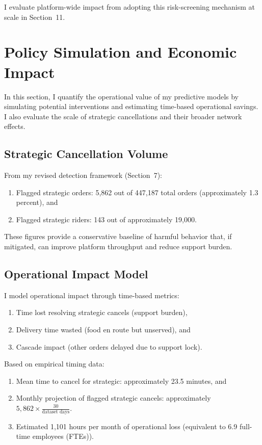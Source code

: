 \documentclass[12pt,letterpaper]{article}
\begin{document}
I evaluate platform-wide impact from adopting this risk-screening mechanism at scale in Section~11.

\section{Policy Simulation and Economic Impact}

In this section, I quantify the operational value of my predictive models by simulating potential interventions and estimating time-based operational savings. I also evaluate the scale of strategic cancellations and their broader network effects.

\subsection{Strategic Cancellation Volume}

From my revised detection framework (Section~7):

\begin{enumerate}
    \item Flagged strategic orders: 5,862 out of 447,187 total orders (approximately 1.3 percent), and
    \item Flagged strategic riders: 143 out of approximately 19,000.
\end{enumerate}

These figures provide a conservative baseline of harmful behavior that, if mitigated, can improve platform throughput and reduce support burden.

\subsection{Operational Impact Model}

I model operational impact through time-based metrics:

\begin{enumerate}
    \item Time lost resolving strategic cancels (support burden),
    \item Delivery time wasted (food en route but unserved), and
    \item Cascade impact (other orders delayed due to support lock).
\end{enumerate}

Based on empirical timing data:

\begin{enumerate}
    \item Mean time to cancel for strategic: approximately 23.5 minutes, and
    \item Monthly projection of flagged strategic cancels: approximately $5,862 \times \frac{30}{\text{dataset days}}$.
    \item Estimated 1,101 hours per month of operational loss (equivalent to 6.9 full-time employees (FTEs)).
\end{enumerate}
\end{document}
